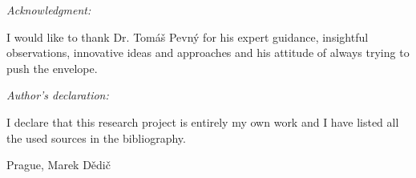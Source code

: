 \noindent \textit{\Large Acknowledgment:}

\noindent I would like to thank Dr. Tomáš Pevný for his expert guidance, insightful observations, innovative ideas and approaches and his attitude of always trying to push the envelope.

\vfill

\noindent \textit{\Large Author's declaration:}

\noindent I declare that this research project is entirely my own work and I have listed all the used sources in the bibliography.

\bigskip

\noindent Prague, \documentdate\hfill Marek Dědič

\vspace{2cm}
